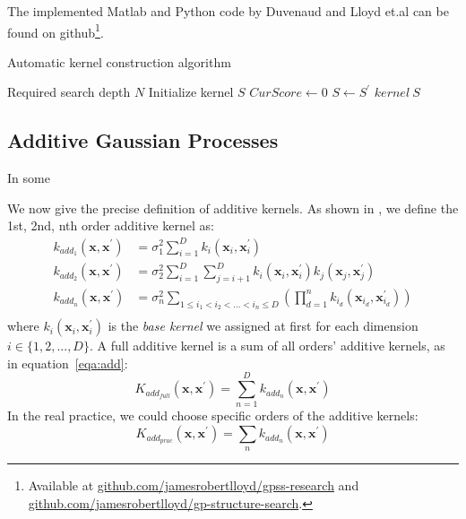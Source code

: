 The implemented Matlab and Python code by Duvenaud and Lloyd et.al can be found on github\footnote{Available at \color{blue}\href{http://github.com/jamesrobertlloyd/gpss-research}{github.com/jamesrobertlloyd/gpss-research} \color{black} and \color{blue}\href{http://github.com/jamesrobertlloyd/gp-structure-search}{github.com/jamesrobertlloyd/gp-structure-search}.}.

\begin{algorithm}[t]
        \caption{Automatic kernel construction algorithm}
        \begin{algorithmic}
        		\Require Required search depth $N$
        		\State Initialize kernel $S$
			\State $CurScore \gets 0$
					\State $S \gets S^{'}$
				\EndIf
			\EndFor
	    	\EndFor
		\State \Return $kernel~S$
       	\end{algorithmic}
\end{algorithm}


\subsection{Additive Gaussian Processes}

\cite{duvenaud2011additive}
In some 


We now give the precise definition of additive kernels.
As shown in \cite{duvenaud2011additive}, we define the 1st, 2nd, nth order additive kernel as:
\begin{align}
k_{add_{1}} (\textbf{x},\textbf{x}^{'}) &= \sigma^2_1 \sum_{i=1}^{D} k_{i} (\textbf{x}_{i},\textbf{x}_{i}^{'}) \\
k_{add_{2}} (\textbf{x},\textbf{x}^{'}) &= \sigma^2_2 \sum_{i=1}^{D} \sum_{j=i+1}^{D} k_{i} (\textbf{x}_{i},\textbf{x}_{i}^{'}) k_{j} (\textbf{x}_{j},\textbf{x}_{j}^{'}) \\
k_{add_{n}} (\textbf{x},\textbf{x}^{'}) &= \sigma^2_n \sum_{1 \leqslant i_1 < i_2 < ... < i_n \leqslant D} ( \prod_{d=1}^{n} k_{i_d} (\textbf{x}_{i_d},\textbf{x}_{i_d}^{'}) ) \\
\end{align}
where $k_{i} (\textbf{x}_{i},\textbf{x}_{i}^{'})$ is the \emph{base kernel} we assigned at first for each dimension $i \in \{1,2,...,D\}$.
A full additive kernel is a sum of all orders' additive kernels, as in equation~\ref{eqa:add}:
\begin{equation} \label{eqa:add}
K_{add_{full}} (\textbf{x},\textbf{x}^{'}) = \sum_{n=1}^{D} k_{add_{n}} (\textbf{x},\textbf{x}^{'})
\end{equation}
In the real practice, we could choose specific orders of the additive kernels:
\begin{equation} \label{eqa:add}
K_{add_{prac}} (\textbf{x},\textbf{x}^{'}) = \sum_{n} k_{add_{n}} (\textbf{x},\textbf{x}^{'})
\end{equation}

